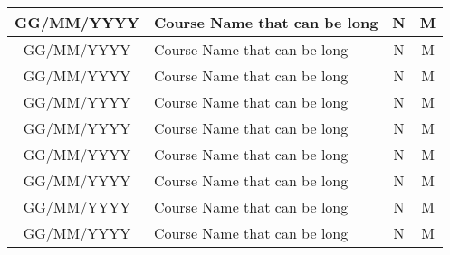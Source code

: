 \documentclass[10pt,a4paper,ragged2e]{maltacv}
\begin{document}
\begin{center}
\begin{onehalfspace}
\begin{tabular}{ c m{9.5cm} c c }
  GG/MM/YYYY & Course Name that can be long & N & M \\\hline
  GG/MM/YYYY & Course Name that can be long & N & M \\\hline
  GG/MM/YYYY & Course Name that can be long & N & M \\\hline
  GG/MM/YYYY & Course Name that can be long & N & M \\\hline
  GG/MM/YYYY & Course Name that can be long & N & M \\\hline
  GG/MM/YYYY & Course Name that can be long & N & M \\\hline
  GG/MM/YYYY & Course Name that can be long & N & M \\\hline
  GG/MM/YYYY & Course Name that can be long & N & M \\\hline
  GG/MM/YYYY & Course Name that can be long & N & M
\end{tabular}
\end{onehalfspace}
\end{center}

\clearpage
\end{document}
